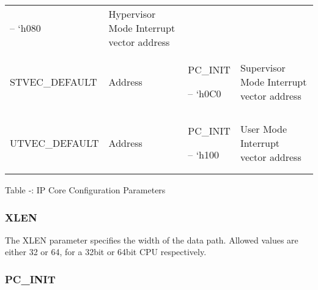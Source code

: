 \begin{longtable}[]{@{}llll@{}}
\begin{minipage}[t]{0.24\columnwidth}
-- `h080\strut
\end{minipage} & \begin{minipage}[t]{0.24\columnwidth}\raggedright\strut
Hypervisor Mode Interrupt vector address\strut
\end{minipage}\tabularnewline
\begin{minipage}[t]{0.24\columnwidth}\raggedright\strut
STVEC\_DEFAULT\strut
\end{minipage} & \begin{minipage}[t]{0.24\columnwidth}\raggedright\strut
Address\strut
\end{minipage} & \begin{minipage}[t]{0.24\columnwidth}\raggedright\strut
PC\_INIT

-- `h0C0\strut
\end{minipage} & \begin{minipage}[t]{0.24\columnwidth}\raggedright\strut
Supervisor Mode Interrupt vector address\strut
\end{minipage}\tabularnewline
\begin{minipage}[t]{0.24\columnwidth}\raggedright\strut
UTVEC\_DEFAULT\strut
\end{minipage} & \begin{minipage}[t]{0.24\columnwidth}\raggedright\strut
Address\strut
\end{minipage} & \begin{minipage}[t]{0.24\columnwidth}\raggedright\strut
\protect\hypertarget{OLE_LINK1}{}{\protect\hypertarget{OLE_LINK2}{}{}}PC\_INIT

-- `h100\strut
\end{minipage} & \begin{minipage}[t]{0.24\columnwidth}\raggedright\strut
User Mode Interrupt vector address\strut
\end{minipage}\tabularnewline
\bottomrule
\end{longtable}

\protect\hypertarget{_Ref367027613}{}{}Table ‑: IP Core Configuration
Parameters

\subsubsection{XLEN}\label{xlen}

The XLEN parameter specifies the width of the data path. Allowed values
are either 32 or 64, for a 32bit or 64bit CPU respectively.

\subsubsection{PC\_INIT}\label{pc_init}

